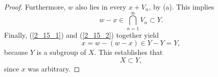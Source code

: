 \begin{proof}
Furthermore, $w$ also lies in every $x + V_n$, by (a). This implies %
%
\begin{equation}\label{2_15_2}
  w - x \in \bigcap_{n=1}^\infty V_n \subset Y. 
\end{equation}
%
Finally, (\ref{2_15_1}) and (\ref{2_15_2}) together yield %
%
\begin{equation}
  x = w - (w - x) \in Y - Y = Y,
\end{equation}
%
because $Y$ is a subgroup of $X$. This establishes that %
%
\begin{equation}
  X \subset Y, 
\end{equation}
%
since $x$ was arbitrary.
\end{proof} 

